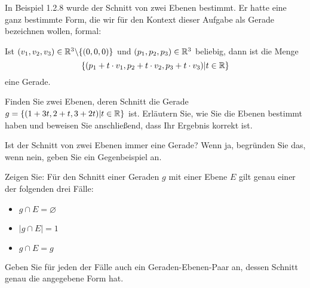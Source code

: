 \begin{Problem}
	In Beispiel 1.2.8 wurde der Schnitt von zwei Ebenen bestimmt. Er hatte eine ganz bestimmte Form, die wir für den Kontext dieser Aufgabe als Gerade bezeichnen wollen, formal:
	
	Ist $(v_1 , v_2, v_3) \in \mathbb{R}^3 \backslash \{(0, 0, 0)\}$ und $(p_1 , p_2 , p_3 ) \in \mathbb{R}^3$ beliebig, dann ist die Menge
	\[\{(p_1 + t \cdot v_1, p_2 + t \cdot v_2 , p_3 + t \cdot v_3 )|t \in \mathbb{R}\}\]
	eine Gerade.
	\begin{parts}
		\item  Finden Sie zwei Ebenen, deren Schnitt die Gerade $g = \{(1 + 3t, 2 + t, 3 + 2t)|t \in \mathbb{R}\}$ ist. Erläutern Sie, wie Sie die Ebenen bestimmt haben und beweisen Sie anschließend, dass Ihr Ergebnis korrekt ist.
		\item Ist der Schnitt von zwei Ebenen immer eine Gerade? Wenn ja, begründen Sie das, wenn nein, geben Sie ein Gegenbeispiel an.
		\item Zeigen Sie: Für den Schnitt einer Geraden $g$ mit einer Ebene $E$ gilt genau einer der folgenden drei Fälle:
		\begin{itemize}
			\item $g\cap E=\varnothing$ 
			\item $|g\cap E|=1$ 
			\item $g\cap E=g$
		\end{itemize}
		Geben Sie für jeden der Fälle auch ein Geraden-Ebenen-Paar an, dessen Schnitt genau die angegebene Form hat.
	\end{parts}
\end{Problem}
